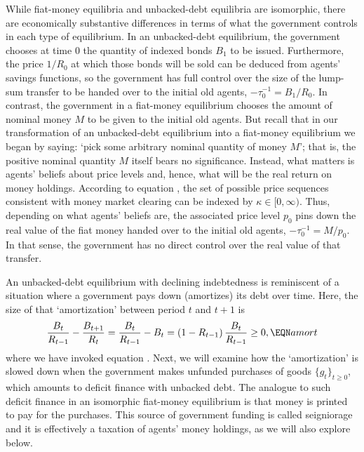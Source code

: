 While fiat-money equilibria and unbacked-debt 
equilibria are  isomorphic, there are economically substantive differences in terms
of what the government controls in each type of equilibrium.  In an unbacked-debt equilibrium,
the government chooses at time $0$ the quantity of 
indexed bonds $B_1$ to be issued. Furthermore, the price 
$1/R_0$ at which those bonds will be sold can be deduced
from agents' savings functions, so the government has 
full control over the size 
of the lump-sum transfer to be handed over to the 
initial old agents, $-\tau^{-1}_0 = B_1 / R_0$. 
In contrast, the government in a fiat-money 
equilibrium chooses the amount of nominal money $M$ 
to be given to the initial old agents. 
But recall that in  our transformation of an unbacked-debt 
equilibrium into a fiat-money equilibrium we
began by saying: `pick some arbitrary nominal 
quantity of money $M$'; that is, the positive nominal quantity $M$ itself
bears no significance. Instead, what matters is 
agents' beliefs about price levels and, hence, 
what will be the real return on money holdings.
According to equation , the set of 
possible price sequences consistent with money market 
clearing can be indexed by $\kappa \in [0,\infty)$. 
Thus, depending on what agents' beliefs are, the associated price level $p_0$ pins down the 
real value of the fiat money handed over to the 
initial old agents, $-\tau^{-1}_0 = M / p_0$. 
In that sense, the government has no direct control
over the real value of that transfer.

 


An unbacked-debt equilibrium with declining 
indebtedness is reminiscent of a situation where a
government pays down (amortizes) its debt 
over time. Here, the size of that `amortization' 
between period $t$ and $t+1$ is
$$ {B_t \over R_{t-1}} - {B_{t+1} \over R_t}
= {B_t \over R_{t-1}} - B_t
= (1-R_{t-1})\,{B_t \over R_{t-1}} \geq 0,  \EQN amort
$$
where we have invoked equation .
Next, we will examine how the `amortization' 
is slowed down when the government makes unfunded 
purchases of goods $\{g_t\}_{t\geq 0}$, 
which amounts to deficit finance with unbacked debt. 
The analogue to such deficit finance in an isomorphic 
fiat-money equilibrium is that money is printed to 
pay for the purchases. This source of
government funding is called seigniorage and it is 
effectively a taxation of agents' money holdings,
as we will also explore below.



